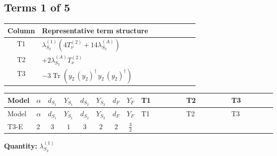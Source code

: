 \documentclass[8pt]{article}
\begin{document}
\begin{landscape}
\subsection*{Terms 1 of 5}
\begin{center}
\begin{tabular}{@{}c >{\raggedright\arraybackslash}p{0.82\linewidth}@{}}
\toprule
Column & Representative term structure \\
\midrule
T1 & \(\displaystyle {\lambda_{S_2}^{(1)}} (4 T_{\nu}^{(2)}+14 {\lambda_{S_2}^{(A)}})\) \\
\midrule
T2 & \(\displaystyle +2 {\lambda_{S_2}^{(A)}} T_{\nu}^{(2)}\) \\
\midrule
T3 & \(\displaystyle -3 \operatorname{Tr}\!\left({y_2}\,\left({y_2}\right)^{\dagger}\,{y_2}\,\left({y_2}\right)^{\dagger}\right)\) \\
\midrule
\bottomrule
\end{tabular}
\end{center}
\smallskip
\tiny
\begin{longtable}{@{}llcccccc >{\raggedright\arraybackslash}p{0.21\linewidth} >{\raggedright\arraybackslash}p{0.21\linewidth} >{\raggedright\arraybackslash}p{0.21\linewidth}@{}}
\toprule
Model & $\alpha$ & $d_{S_1}$ & $Y_{S_1}$ & $d_{S_2}$ & $Y_{S_2}$ & $d_F$ & $Y_F$ & T1 & T2 & T3 \\
\midrule
\endfirsthead
\toprule
Model & $\alpha$ & $d_{S_1}$ & $Y_{S_1}$ & $d_{S_2}$ & $Y_{S_2}$ & $d_F$ & $Y_F$ & T1 & T2 & T3 \\
\midrule
\endhead
T3-E & $2$ & $3$ & $1$ & $3$ & $2$ & $2$ & $\frac{3}{2}$ & \scriptsize\adjustbox{max width=\linewidth}{$\begin{gathered} {\lambda_{S_2}^{(1)}} (4 T_{\nu}^{(2)}+14 {\lambda_{S_2}^{(A)}})\end{gathered}$} & \scriptsize\adjustbox{max width=\linewidth}{$\begin{gathered} +2 {\lambda_{S_2}^{(A)}} T_{\nu}^{(2)}\end{gathered}$} & \scriptsize\adjustbox{max width=\linewidth}{$\begin{gathered} -3 \operatorname{Tr}\!\left({y_2}\,\left({y_2}\right)^{\dagger}\,{y_2}\,\left({y_2}\right)^{\dagger}\right)\end{gathered}$} \\
\midrule
\bottomrule
\end{longtable}
\clearpage
\noindent\textbf{Quantity: }$\lambda_{S_2}^{(1)}$\par\smallskip

\end{landscape}
\end{document}
